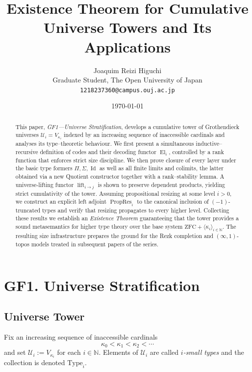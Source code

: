\documentclass[a4paper,11pt]{article}
\title{Existence Theorem for Cumulative Universe Towers and Its Applications}
\author{Joaquim Reizi Higuchi\\
Graduate Student, The Open University of Japan\\
\texttt{1218237360@campus.ouj.ac.jp}}
\date{\today}
\newcommand{\El}{\operatorname{El}}          %
\newcommand{\lift}{\operatorname{lift}}      %
\begin{document}
\maketitle

\begin{abstract}
\noindent
This paper, \emph{GF1—Universe Stratification}, develops a cumulative tower of Grothendieck universes \(\mathcal U_i = V_{\kappa_i}\) indexed by an increasing sequence of inaccessible cardinals and analyses its type–theoretic behaviour. We first present a simultaneous inductive–recursive definition of codes and their decoding functor \(\El_i\), controlled by a rank function that enforces strict size discipline. We then prove closure of every layer under the basic type formers \(\Pi,\Sigma,\operatorname{Id}\) as well as all finite limits and colimits, the latter obtained via a new Quotient constructor together with a rank–stability lemma. A universe‐lifting functor \(\lift_{i\to j}\) is shown to preserve dependent products, yielding strict cumulativity of the tower. Assuming propositional resizing at some level \(i>0\), we construct an explicit left adjoint \(\operatorname{PropRes}_i\) to the canonical inclusion of \((-1)\)-truncated types and verify that resizing propagates to every higher level. Collecting these results we establish an \emph{Existence Theorem} guaranteeing that the tower provides a sound metasemantics for higher type theory over the base system \(\text{ZFC} + \langle \kappa_i\rangle_{i\in\mathbb N}\). The resulting size infrastructure prepares the ground for the Rezk completion and \((\infty,1)\)-topos models treated in subsequent papers of the series.
\end{abstract}


\section*{GF1. Universe Stratification}

\subsection{Universe Tower}
\begin{definition}\label{def:universe-tower}
Fix an increasing sequence of inaccessible cardinals
\[
  \kappa_{0}<\kappa_{1}<\kappa_{2}<\dotsb
\]
and set \(\mathcal U_{i}:=V_{\kappa_{i}}\) for each \(i\in\mathbb{N}\).
Elements of \(\mathcal U_{i}\) are called \emph{\(i\)-small types} and the
collection is denoted \(\mathrm{Type}_{i}\).
\end{definition}
\end{document}
